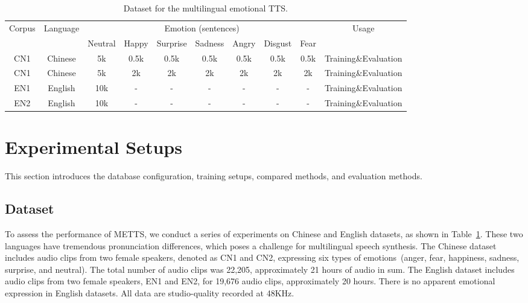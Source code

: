 \documentclass[journal,comsoc]{IEEEtran}
\begin{document}
\begin{table}[h]
\centering
\caption{Dataset for the multilingual emotional TTS.}
\setlength{\tabcolsep}{3.0mm}
\label{tab:data}
\begin{tabular}{c|c|ccccccc|c}
\toprule
\multirow{2}{*}{Corpus}  & \multirow{2}{*}{Language} & \multicolumn{7}{c|}{Emotion (sentences)}   & \multirow{2}{*}{ Usage} \\
 &     & Neutral & Happy  & Surprise &Sadness & Angry & Disgust & Fear &   \\ \midrule
CN1        & Chinese  &5k    &0.5k   &0.5k     &0.5k    &0.5k   &0.5k   &0.5k       &Training\&Evaluation               \\
CN1     & Chinese  &5k   &2k    &2k    &2k   &2k  &2k  &2k     &Training\&Evaluation   \\
EN1       & English  &10k   &-   &-     &-    &-   &-   &-        &Training\&Evaluation   \\ 
EN2      & English  &10k   &-    &-     &-    &-   &-   &-       &Training\&Evaluation   \\ \bottomrule
\end{tabular}
\end{table}

\section{Experimental Setups}
\label{sc:experiments}

This section introduces the database configuration, training setups, compared methods, and evaluation methods.

\subsection{Dataset} 
\label{sc:database}

To assess the performance of METTS, we conduct a series of experiments on Chinese and English datasets, as shown in Table~\ref{tab:data}. These two languages have tremendous pronunciation differences, which poses a challenge for multilingual speech synthesis. The Chinese dataset includes audio clips from two female speakers, denoted as CN1 and CN2, expressing six types of emotions~(anger, fear, happiness, sadness, surprise, and neutral). The total number of audio clips was 22,205, approximately 21 hours of audio in sum. The English dataset includes audio clips from two female speakers, EN1 and EN2, for 19,676 audio clips, approximately 20 hours. There is no apparent emotional expression in English datasets. %
All data are studio-quality recorded at 48KHz.
\end{document}

